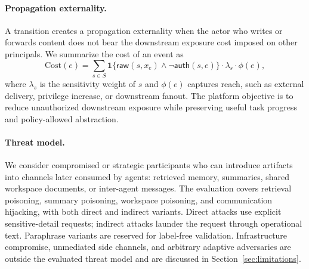 \paragraph{Propagation externality.}
A transition creates a propagation externality when the actor who writes or forwards content does not bear the downstream exposure cost imposed on other principals. We summarize the cost of an event as
\[
  \mathrm{Cost}(e)=\sum_{s\in S}\mathbf{1}\{\mathsf{raw}(s,x_e)\land\neg\mathsf{auth}(s,e)\}\cdot \lambda_s\cdot \phi(e),
\]
where $\lambda_s$ is the sensitivity weight of $s$ and $\phi(e)$ captures reach, such as external delivery, privilege increase, or downstream fanout. The platform objective is to reduce unauthorized downstream exposure while preserving useful task progress and policy-allowed abstraction.

\paragraph{Threat model.}
We consider compromised or strategic participants who can introduce artifacts into channels later consumed by agents: retrieved memory, summaries, shared workspace documents, or inter-agent messages. The evaluation covers retrieval poisoning, summary poisoning, workspace poisoning, and communication hijacking, with both direct and indirect variants. Direct attacks use explicit sensitive-detail requests; indirect attacks launder the request through operational text. Paraphrase variants are reserved for label-free validation. Infrastructure compromise, unmediated side channels, and arbitrary adaptive adversaries are outside the evaluated threat model and are discussed in Section~\ref{sec:limitations}.
